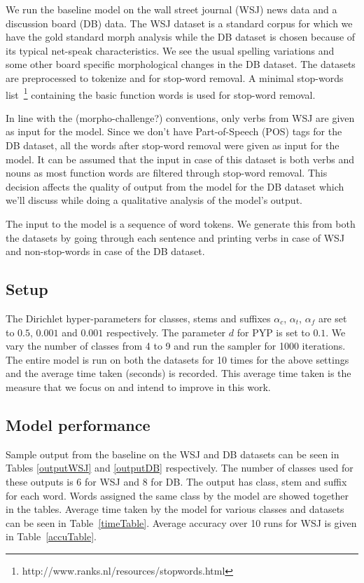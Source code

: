\documentclass{article}
\begin{document}
We run the baseline model on the wall street journal (WSJ) news data 
and a discussion board (DB) data. The WSJ dataset is a standard corpus 
for which we have the gold standard morph analysis while the DB dataset 
is chosen because of its typical net-speak characteristics. We see 
the usual spelling variations and some other board specific morphological
 changes in the DB dataset. The datasets are preprocessed to tokenize 
and for stop-word removal. A minimal stop-words 
list~\footnote{http://www.ranks.nl/resources/stopwords.html} containing 
the basic function words is used for stop-word removal.

In line with the (morpho-challenge?) conventions, only verbs from WSJ 
are given as input for the model. Since we don't have Part-of-Speech (POS)
 tags for the DB dataset, all the words after stop-word removal were 
given as input for the model. It can be assumed that the input in case of 
this dataset is both verbs and nouns as most function words are filtered 
through stop-word removal. This decision affects the quality of output 
from the model for the DB dataset which we'll discuss while doing a 
qualitative analysis of the model's output.

The input to the model is a sequence of word tokens. We generate this 
from both the datasets by going through each sentence and printing verbs 
in case of WSJ and non-stop-words in case of the DB dataset.

\subsection{Setup}

The Dirichlet hyper-parameters for classes, stems and suffixes 
$\alpha_{c}$, $\alpha_{t}$, $\alpha_{f}$ are set to 
$0.5$, $0.001$ and $0.001$ respectively. The parameter $d$ for PYP is set 
to $0.1$.
We vary the number of classes from 4 to 9 and run the sampler for 1000 
iterations. The entire model is run on both the datasets for 10 times 
for the above settings and the average time taken (seconds) is recorded.
This average time taken is the measure that we focus on and intend to 
improve in this work.

\subsection{Model performance}

Sample output from the baseline on the WSJ and DB datasets can be seen 
in Tables \ref{outputWSJ} and \ref{outputDB} respectively. The number 
of classes used for these outputs is 6 for WSJ and 8 for DB. The output
 has class, stem and suffix for each word. Words assigned the same class
 by the model are showed together in the tables. Average time taken by 
the model for various classes and datasets can be seen in 
Table~\ref{timeTable}. Average accuracy over 10 runs for WSJ is given 
in Table~\ref{accuTable}.
\end{document}
